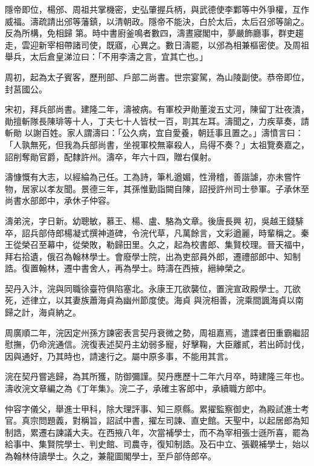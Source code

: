 \begin{pinyinscope}
 隱帝即位，楊邠、周祖共掌機密，史弘肇握兵柄，與武德使李鄴等中外爭權，互作威福。濤疏請出邠等藩鎮，以清朝政。隱帝不能決，白於太后，太后召邠等諭之。反為所構，免相歸
 第。時中書廚釜鳴者數四，濤晝寢閣中，夢嚴飾廳事，群吏趨走，雲迎新宰相帶諸司使，既寤，心異之。數日濤罷，以邠為相兼樞密使。及周祖舉兵，太后倉皇涕泣曰：「不用李濤之言，宜其亡也。」



 周初，起為太子賓客，歷刑部、戶部二尚書。世宗宴駕，為山陵副使。恭帝即位，封莒國公。



 宋初，拜兵部尚書。建隆二年，濤被病。有軍校尹勛董浚五丈河，陳留丁壯夜潰，勛擅斬隊長陳琲等十人，丁夫七十人皆杖一百，刵其左耳。濤聞之，力疾草奏，請斬勛
 以謝百姓。家人謂濤曰：「公久病，宜自愛養，朝廷事且置之。」濤憤言曰：「人孰無死，但我為兵部尚書，坐視軍校無辜殺人，烏得不奏？」太祖覽奏嘉之，詔削奪勛官爵，配隸許州。濤卒，年六十四，贈右僕射。



 濤慷慨有大志，以經綸為己任。工為詩，筆札遒媚，性滑稽，善諧謔，亦未嘗忤物，居家以孝友聞。景德三年，其孫惟勤詣闕自陳，詔授許州司士參軍。子承休至尚書水部郎中，承休子仲容。



 濤弟浣，字日新。幼聰敏，慕王、楊、盧、駱為文章。後唐長興
 初，吳越王錢騑卒，詔兵部侍郎楊凝式撰神道碑，令浣代草，凡萬餘言，文彩遒麗，時輩稱之。秦王從榮召至幕中，從榮敗，勒歸田里。久之，起為校書郎、集賢校理。晉天福中，拜右拾遺，俄召為翰林學士。會廢學士院，出為吏部員外郎，遷禮部郎中、知制誥。復置翰林，遷中書舍人，再為學士。時濤在西掖，縉紳榮之。



 契丹入汴，浣與同職徐臺符俱陷塞北。永康王兀欲襲位，置浣宣政殿學士。兀欲死，述律立，以其妻族蕭海貞為幽州節度使。海貞
 與浣相善，浣乘間諷海貞以南歸之計，海貞納之。



 周廣順二年，浣因定州孫方諫密表言契丹衰微之勢，周祖嘉焉，遣諜者田重霸繼詔慰撫，仍命浣通信。浣復表述契丹主幼弱多寵，好擊鞠，大臣離貳，若出師討伐，因與通好，乃其時也，請速行之。屬中原多事，不能用其言。



 浣在契丹嘗逃歸，為其所獲，防御彌謹。契丹應歷十二年六月卒，時建隆三年也。濤收浣文章編之為《丁年集》。浣二子，承確主客郎中，承續職方郎中。



 仲容字儀父，舉進士甲科，除大理評事、知三原縣。累擢監察御史，為殿試進士考官。真宗問題義，對稱旨，詔試中書，擢左司諫、直史館。天聖中，以起居郎為知制誥，累遷右諫議大夫。在西掖八年，次當補學士，而不為宰相張士遜所喜，罷為給事中、集賢院學士、判史館、司農寺，復知制誥。及石中立、張觀補學士，始以為翰林侍讀學士。久之，兼龍圖閣學士，至戶部侍郎卒。




\end{pinyinscope}

